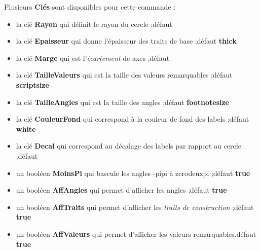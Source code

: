 \documentclass[a4paper,french,11pt]{article}
\newcommand\Cle[1]{{\bfseries\sffamily\textlangle #1\textrangle}}
\begin{document}
\begin{codecles}
Plusieurs \Cle{Clés} sont disponibles pour cette commande :

\begin{itemize}
	\item la clé \Cle{Rayon} qui définit le rayon du cercle ;\hfill{}défaut \Cle{3}
	\item la clé \Cle{Epaisseur} qui donne l'épaisseur des traits de base ;\hfill{}défaut \Cle{thick}
	\item la clé \Cle{Marge} qui est l'\textit{écartement} de axes  ;\hfill{}défaut \Cle{0.25}
	\item la clé \Cle{TailleValeurs} qui est la taille des valeurs remarquables ;\hfill{}défaut \Cle{scriptsize}
	\item la clé \Cle{TailleAngles} qui est la taille des angles ;\hfill{}défaut \Cle{footnotesize}
	\item la clé \Cle{CouleurFond} qui correspond à la couleur de fond des labels ;\hfill{}défaut \Cle{white}
	\item la clé \Cle{Decal} qui correspond au décalage des labels par rapport au cercle ;\hfill{}défaut \Cle{10pt}
	\item un booléen \Cle{MoinsPi} qui bascule les angles \og -pipi \fg{} à \og zerodeuxpi \fg{} ;\hfill{}défaut \Cle{true}
	\item un booléen \Cle{AffAngles} qui permet d'afficher les angles ;\hfill{}défaut \Cle{true}
	\item un booléen \Cle{AffTraits} qui permet d'afficher les \textit{traits de construction}  ;\hfill{}défaut \Cle{true}
	\item un booléen \Cle{AffValeurs} qui permet d'afficher les valeurs remarquables.\hfill{}défaut \Cle{true}
\end{itemize}
\end{codecles}

\pagebreak

\begin{codetex}
\begin{center}
	\begin{tikzpicture}[line join=bevel]
			\CercleTrigo[Rayon=2.5,AffValeurs=false,Decal=8pt]
		\end{tikzpicture}
	~~~~
	\begin{tikzpicture}[line join=bevel]
			\CercleTrigo[Rayon=2.5,AffAngles=false]
		\end{tikzpicture}
	~~~~
	\begin{tikzpicture}[line join=bevel]
			\CercleTrigo[Rayon=2.5,MoinsPi=false,CouleurFond=orange!15]
		\end{tikzpicture}
\end{center}
\end{codetex}
\end{document}

